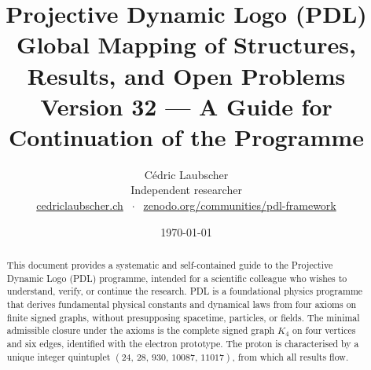 \documentclass[11pt,a4paper]{article}
\title{Projective Dynamic Logo (PDL)\\[4pt]
\large Global Mapping of Structures, Results, and Open Problems\\[2pt]
\normalsize Version 32 --- A Guide for Continuation of the Programme}
\author{C\'edric Laubscher\\[4pt]
\small Independent researcher\\
\small \href{https://cedriclaubscher.ch}{cedriclaubscher.ch}
$\;\cdot\;$
\small \href{https://zenodo.org/communities/pdl-framework/}{zenodo.org/communities/pdl-framework}}
\date{\today}
\theoremstyle{plain}
\theoremstyle{definition}
\theoremstyle{remark}
\newcommand{\Kfour}{K_4}
\newcommand{\quintuplet}{(24,\,28,\,930,\,10087,\,11017)}
\begin{document}
\maketitle
\setcounter{tocdepth}{2}

\begin{abstract}
This document provides a systematic and self-contained guide to the Projective Dynamic Logo (PDL) programme, intended for a scientific colleague who wishes to understand, verify, or continue the research. PDL is a foundational physics programme that derives fundamental physical constants and dynamical laws from four axioms on finite signed graphs, without presupposing spacetime, particles, or fields. The minimal admissible closure under the axioms is the complete signed graph $\Kfour$ on four vertices and six edges, identified with the electron prototype. The proton is characterised by a unique integer quintuplet $\quintuplet$, from which all results flow.


\end{abstract}
\end{document}

